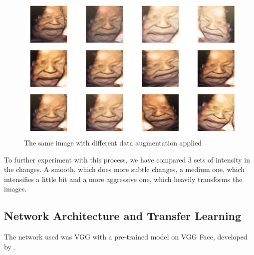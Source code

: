 \begin{figure}[h!tp]
    \centering
    \includegraphics[width=.9\textwidth]{imgs/chap3_data_augmentation.png}
    \caption{The same image with different data augmentation applied}
    \label{fig:data_augmentation}
\end{figure}

To further experiment with this process, we have compared 3 sets of intensity in the changes. A smooth, which does more subtle changes, a medium one, which intensifies a little bit and a more aggressive one, which heavily transforms the images.  

\subsection{Network Architecture and Transfer Learning}

The network used was VGG with a pre-trained model on VGG Face, developed by \cite{ParkhiVZ15}.



